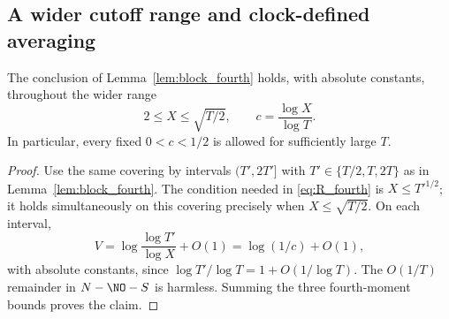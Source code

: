 
\subsection{A wider cutoff range and clock-defined averaging}
\label{reg11:range_section}

\begin{lemma}\label{reg11:block_range}
The conclusion of Lemma~\ref{lem:block_fourth} holds, with absolute
constants, throughout the wider range
\begin{equation}
2\le X\le\sqrt{T/2},\qquad c=\frac{\log X}{\log T}.
\label{reg11:cutoff_range}
\end{equation}
In particular, every fixed $0<c<1/2$ is allowed for sufficiently large $T$.
\end{lemma}

\begin{proof}
Use the same covering by intervals $(T',2T']$ with
$T'\in\{T/2,T,2T\}$ as in Lemma~\ref{lem:block_fourth}.
The condition needed in \eqref{eq:R_fourth} is $X\le T'^{1/2}$;
it holds simultaneously on this covering precisely when
$X\le\sqrt{T/2}$. On each interval,
\[
V=\log\frac{\log T'}{\log X}+O(1)
=\log(1/c)+O(1),
\]
with absolute constants, since $\log T'/\log T=1+O(1/\log T)$.
The $O(1/T)$ remainder in $N-\NO-S$ is harmless. Summing the three
fourth-moment bounds proves the claim.
\end{proof}

